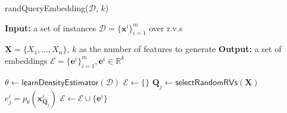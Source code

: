\documentclass{beamer}
\begin{document}
      
 


\begin{frame}
  \vspace{-40pt}
  \begin{algorithm}[H]
    \caption{randQueryEmbedding($\mathcal{D}$, $k$)}\label{rand-i}
    \begin{algorithmic}[1]
      \State \textbf{Input:} a set of instances
      $\mathcal{D}=\{\mathbf{x}^{i}\}_{i=1}^{m}$ over r.v.s\par
      $\mathbf{X}=\{X_1,\dots,X_n\}$, $k$ as the number of features to generate
      \State  \textbf{Output:}  a set of embeddings
      $\mathcal{E}=\{\mathbf{e}^{i}\}_{i=1}^{m}, \mathbf{e}^{i}\in\mathbb{R}^{k}$
      
      \State $\theta\leftarrow\mathsf{learnDensityEstimator}(\mathcal{D})$
      \State $\mathcal{E}\leftarrow\{\}$
      \State $\mathbf{Q}_{j}\leftarrow \mathsf{selectRandomRVs}(\mathbf{X})$
      \State $e^{i}_{j}= p_{\theta}(\mathbf{x}^{i}_{\mathbf{Q}_{j}})$  
      \EndFor
      \State $\mathcal{E}\leftarrow\mathcal{E}\cup\{\mathbf{e}^{i}\}$
      \EndFor
    \end{algorithmic}
    \label{alg_1}
  \end{algorithm}
\end{frame}
\end{document}

